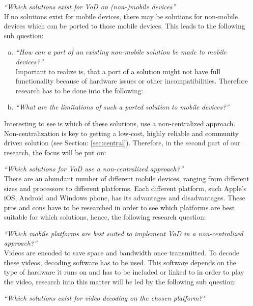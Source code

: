 \begin{list}{Research Question :~}{}

	\item\textit{``Which solutions exist for VoD on (non-)mobile devices''}\\
	
	If no solutions exist for mobile devices, there may be solutions for non-mobile devices which can be ported to those mobile devices. This leads to the following sub question:\\

		\begin{enumerate}[(a)]
			\item\textit{``How can a port of an existing non-mobile solution be made to mobile devices?''}\\
			
			Important to realize is, that a port of a solution might not have full functionality because of hardware issues or other incompatibilities. Therefore research has to be done into the following:\\
			
			\item\textit{``What are the limitations of such a ported solution to mobile devices?''}\\
		\end{enumerate}

	Interesting to see is which of these solutions, use a non-centralized approach. Non-centralization is key to getting a low-cost, highly reliable and community driven solution (see Section: \ref{sec:central}). Therefore, in the second part of our research, the focus will be put on: \\

	\item\textit{``Which solutions for VoD use a non-centralized approach?''}\\

	There are an abundant number of different mobile devices, ranging from different sizes and processors to different platforms. Each different platform, such Apple's iOS, Android and Windows phone, has its advantages and disadvantages. These pros and cons have to be researched in order to see which platforms are best suitable for which solutions, hence, the following research question:\\

	\item\textit{``Which mobile platforms are best suited to implement VoD in a non-centralized approach?''}\\
	
	Videos are encoded to save space and bandwidth once transmitted. To decode these videos, decoding software has to be used. This software depends on the type of hardware it runs on and has to be included or linked to in order to play the video, research into this matter will be led by the following sub question:\\

	\item\textit{``Which solutions exist for video decoding on the chosen platform?"}\\
\end{list}

